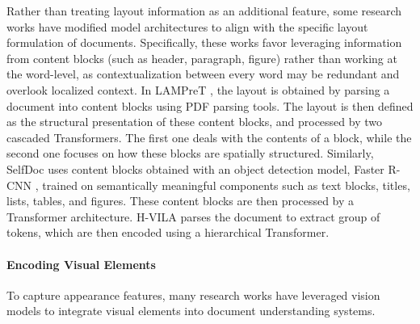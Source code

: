 
Rather than treating layout information as an additional feature, some research works have modified model architectures to align with the specific layout formulation of documents. Specifically, these works favor leveraging information from content blocks (such as header, paragraph, figure) rather than working at the word-level, as contextualization between every word may be redundant and overlook localized context. In \ac{LAMPreT} \citep{wu2021lampret}, the layout is obtained by parsing a document into content blocks using PDF parsing tools. The layout is then defined as the structural presentation of these content blocks, and processed by two cascaded Transformers. The first one deals with the contents of a block, while the second one focuses on how these blocks are spatially structured. Similarly, SelfDoc \citep{li2021selfdoc} uses content blocks obtained with an object detection model, Faster R-CNN \citep{ren2015faster}, trained on semantically meaningful components such as text blocks, titles, lists, tables, and figures. These content blocks are then processed by a Transformer architecture. H-VILA \citep{shen2022vila} parses the document to extract group of tokens, which are then encoded using a hierarchical Transformer.


\paragraph{Encoding Visual Elements} 

To capture appearance features, many research works have leveraged vision models to integrate visual elements into document understanding systems.


